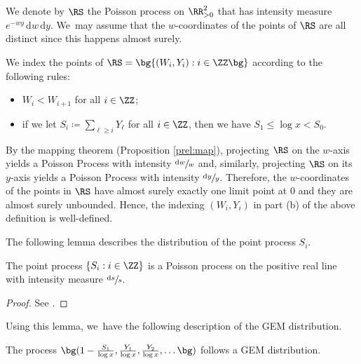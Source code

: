 \skpt
\begin{deff}\label{dfn:Poisson Process R}
\begin{enumeratea}
\item We denote by $\RS$ the Poisson process on $\RR_{>0}^2$ that has intensity measure $e^{-wy}\, \mathrm dw\, \mathrm dy$. We~may assume that the $w$-coordinates of the points of $\RS$ are all distinct since this happens almost surely.
\item We index the points of $\RS = \bg\{(W_i, Y_i) : i \in\ZZ\bg\}$ according to the following rules:
\begin{itemize}
\item $W_i < W_{i+1}$ for all $i\in\ZZ$;
\item if we let $S_i\coloneqq \sum_{\ell \ge i} Y_\ell$ for all $i\in\ZZ$, then we have $S_1 \le \log x < S_0$.
\end{itemize}
\end{enumeratea}
\end{deff}

\begin{rems}
By the mapping theorem (Proposition \ref{prel:map}), projecting $\RS$ on the $w$-axis yields a Poisson Process with intensity $\sfrac{\mathrm dw}{w}$ and, similarly, projecting $\RS$ on its $y$\nobreakdash-axis yields a Poisson Process with intensity $\sfrac{\mathrm dy}{y}$. Therefore, the $w$-coordinates of the points in $\RS$ have almost surely exactly one limit point at $0$ and they are almost surely unbounded. Hence, the indexing $(W_i,Y_i)$ in part (b) of the above definition is well-defined.
\end{rems}

The following lemma describes the distribution of the point process $S_i$.

\begin{lem}
\label{lem:scale-invariant-spacing-lemma}
The point process $\{S_i : i \in \ZZ\}$ is a Poisson process on the positive real line with intensity measure $\sfrac{\mathrm ds}{s}$.
\end{lem}

\begin{proof}
See \cite[Lem.\,7.1]{ABT06}.
\end{proof}

Using this lemma, we~have the following description of the GEM distribution.

\begin{prop}
\label{prop:gemfrompi}
The process $\bg(1-\frac{S_1}{\log x}, \frac{Y_1}{\log x}, \frac{Y_2}{\log x}, \ldots\bg)$ follows a GEM distribution.
\end{prop}

